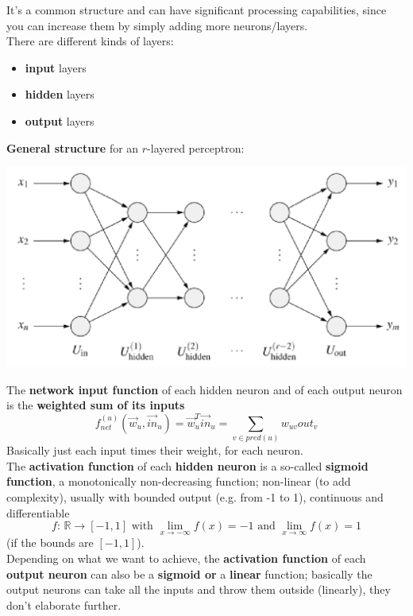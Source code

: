 It's a common structure and can have significant processing capabilities, since you can increase them by simply adding more neurons/layers.\\

There are different kinds of layers:
\begin{itemize}
	\item \textbf{input} layers
	\item \textbf{hidden} layers
	\item \textbf{output} layers
\end{itemize}

\textbf{General structure} for an $r$-layered perceptron:
\begin{center}
	\includegraphics[width=0.9\columnwidth]{img/NN/MLP1}
\end{center}

\newpage

The \textbf{network input function} of each hidden neuron and of each output neuron is the \textbf{weighted sum of its inputs}
$$ f_{net}^{(u)} \left(\vec{w}_u, \vec{in}_u\right) = \vec{w}_u^T \vec{in}_u = \sum_{v \in pred(u)} w_{uv} out_v $$
Basically just each input times their weight, for each neuron.\\


The \textbf{activation function} of each \textbf{hidden neuron} is a so-called \textbf{sigmoid function}, a monotonically non-decreasing function; non-linear (to add complexity), usually with bounded output (e.g. from -1 to 1), continuous and differentiable
$$ f: \, \mathbb{R} \rightarrow [-1, 1] \text{ with } \lim_{x \rightarrow - \infty} f(x) = -1 \text{ and } \lim_{x \rightarrow \infty} f(x) = 1 $$
(if the bounds are $[-1, 1]$).\\

Depending on what we want to achieve, the \textbf{activation function} of each \textbf{output neuron} can also be a \textbf{sigmoid or} a \textbf{linear} function; basically the output neurons can take all the inputs and throw them outside (linearly), they don't elaborate further.\\

